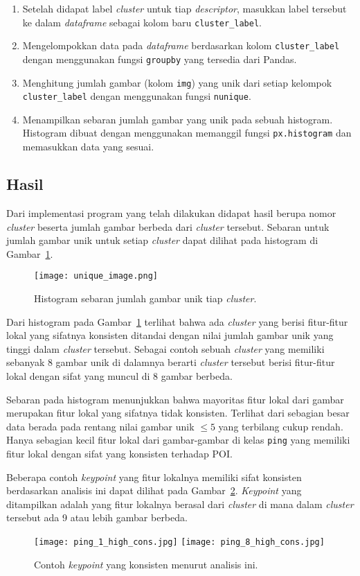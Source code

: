 \begin{enumerate}
	\item Setelah didapat label \textit{cluster} untuk tiap \textit{descriptor}, masukkan label tersebut ke dalam \textit{dataframe} sebagai kolom baru \texttt{cluster\_label}.
	\item Mengelompokkan data pada \textit{dataframe} berdasarkan kolom \texttt{cluster\_label} dengan menggunakan fungsi \texttt{groupby} yang tersedia dari Pandas.
	\item Menghitung jumlah gambar (kolom \texttt{img}) yang unik dari setiap kelompok \texttt{cluster\_label} dengan menggunakan fungsi \texttt{nunique}.
	\item Menampilkan sebaran jumlah gambar yang unik pada sebuah histogram. Histogram dibuat dengan menggunakan memanggil fungsi \texttt{px.histogram} dan memasukkan data yang sesuai.
\end{enumerate}

\subsection{Hasil}
Dari implementasi program yang telah dilakukan didapat hasil berupa nomor \textit{cluster} beserta jumlah gambar berbeda dari \textit{cluster} tersebut. Sebaran untuk jumlah gambar unik untuk setiap \textit{cluster} dapat dilihat pada histogram di Gambar~\ref{fig:unique_image}.
\begin{figure}[H]
	\centering
	\texttt{[image: unique\_image.png]}
	\caption{Histogram sebaran jumlah gambar unik tiap \textit{cluster}.}
	\label{fig:unique_image}
\end{figure}
\vspace{-10pt}
Dari histogram pada Gambar~\ref{fig:unique_image} terlihat bahwa ada \textit{cluster} yang berisi fitur-fitur lokal yang sifatnya konsisten ditandai dengan nilai jumlah gambar unik yang tinggi dalam \textit{cluster} tersebut. Sebagai contoh sebuah \textit{cluster} yang memiliki sebanyak 8 gambar unik di dalamnya berarti \textit{cluster} tersebut berisi fitur-fitur lokal dengan sifat yang muncul di 8 gambar berbeda. 

Sebaran pada histogram menunjukkan bahwa mayoritas fitur lokal dari gambar merupakan fitur lokal yang sifatnya tidak konsisten. Terlihat dari sebagian besar data berada pada rentang nilai gambar unik $\leq5$ yang terbilang cukup rendah. Hanya sebagian kecil fitur lokal dari gambar-gambar di kelas \texttt{ping} yang memiliki fitur lokal dengan sifat yang konsisten terhadap POI.

Beberapa contoh \textit{keypoint} yang fitur lokalnya memiliki sifat konsisten berdasarkan analisis ini dapat dilihat pada Gambar~\ref{fig:keypoint_konsisten}. \textit{Keypoint} yang ditampilkan adalah yang fitur lokalnya berasal dari \textit{cluster} di mana dalam \textit{cluster} tersebut ada 9 atau lebih gambar berbeda.
\begin{figure}[H]
	\centering
	\texttt{[image: ping\_1\_high\_cons.jpg]}
	\texttt{[image: ping\_8\_high\_cons.jpg]}
	\caption{Contoh \textit{keypoint} yang konsisten menurut analisis ini.}
	\label{fig:keypoint_konsisten}
\end{figure}

